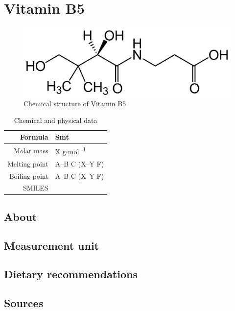 \documentclass{book}
\begin{document}
\chapter{Vitamin B5}
\begin{figure}[h]
	\caption{Chemical structure of Vitamin B5}
	\centering \includegraphics[width=\textwidth]{images/Vitamin_B5_chemical_structure}
\end{figure}

\begin{table}[h]
	\caption{Chemical and physical data}
	\centering \begin{tabular}{| r | l |}
		\hline
		Formula & Smt\\ \hline
		Molar mass & X g$\cdot$mol \textsuperscript{-1}\\ \hline
		Melting point & A--B \degree C (X--Y \degree F)\\ \hline
		Boiling point & A--B \degree C (X--Y \degree F)\\ \hline
		SMILES & \\ \hline
	\end{tabular}
\end{table}
\newpage

\section{About}


\section{Measurement unit}


\section{Dietary recommendations}


\section{Sources}
\end{document}
